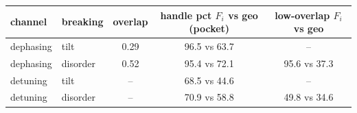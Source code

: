 \begin{tabular}{llccc}
\toprule
channel & breaking & overlap & handle pct $F_i$ vs geo (pocket) & low-overlap $F_i$ vs geo \\
\midrule
dephasing & tilt & 0.29 & 96.5 vs 63.7 & -- \\
dephasing & disorder & 0.52 & 95.4 vs 72.1 & 95.6 vs 37.3 \\
detuning & tilt & -- & 68.5 vs 44.6 & -- \\
detuning & disorder & -- & 70.9 vs 58.8 & 49.8 vs 34.6 \\
\bottomrule
\end{tabular}
